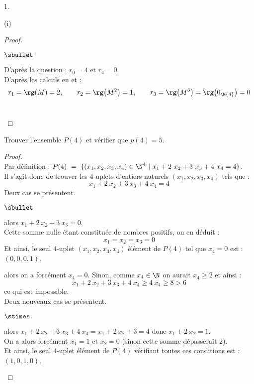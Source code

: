 \documentclass[11pt]{article}%
\begin{document}
\begin{noliste}{1.}
\begin{noliste}{(i)}
\begin{proof}
\begin{noliste}{$\sbullet$}
        \item D'après la question  : $r_0 = 4$ et $r_4 = 0$.\\
          D'après les calculs en  et  :
          \[
          r_1 = \rg(M) = 2, \qquad r_2 = \rg\big( M^2 \big) = 1,
          \qquad r_3 = \rg\big( M^3 \big) = \rg\big( 0_{\M{4}} \big) =
          0
          \]
          ~\\[-1.2cm]
        \end{noliste}
      \end{proof}
      
    \item Trouver l'ensemble $P(4)$ et vérifier que $p(4)=5$.
    \end{noliste}

    \begin{proof}~\\%
      Par définition : $P(4) \ = \ \{ (x_1, x_2, x_3, x_4) \in \N^4 \
      | \ x_1 + 2 \ x_2 + 3 \ x_3 + 4 \ x_4 = 4\}$.\\
      Il s'agit donc de trouver les $4$-uplets d'entiers naturels
      $(x_1, x_2, x_3, x_4)$ tels que : 
      \[
      x_1 + 2 \ x_2 + 3 \ x_3 + 4 \ x_4 = 4
      \]
      Deux cas se présentent.
      \begin{noliste}{$\sbullet$}
      \item {} alors $x_1 + 2 \ x_2 + 3 \ x_3 =
        0$.\\
        Cette somme nulle étant constituée de nombres positifs, on en
        déduit :
        \[
        x_1 = x_2 = x_3 = 0
        \]
        Et ainsi, le seul $4$-uplet $(x_1, x_2, x_3, x_4)$ élément de
        $P(4)$ tel que $x_4 = 0$ est : $(0, 0, 0, 1)$.

      \item {} alors on a forcément $x_4 =
        0$. Sinon, comme $x_4 \in \N$ on aurait $x_4 \geq 2$ et ainsi
        :
        \[
        x_1 + 2 \ x_2 + 3 \ x_3 + 4 \ x_4 \geq 4 \ x_4 \geq 8 > 6
        \]
        ce qui est impossible.\\
        Deux nouveaux cas se présentent.
        \begin{noliste}{$\stimes$}
        \item {} alors $x_1 + 2 \ x_2 + 3 \ x_3
          + 4 \ x_4 = x_1 + 2 \ x_2 + 3 = 4$ donc $x_1 + 2 \ x_2 = 1$.\\
          On a alors forcément $x_1 = 1$ et $x_2 = 0$ (sinon cette
          somme dépasserait $2$).\\
          Et ainsi, le seul $4$-uplet élément de $P(4)$ vérifiant
          toutes ces conditions est : $(1, 0, 1, 0)$.


\end{noliste}
\end{noliste}
\end{proof}
\end{noliste}
\end{document}
